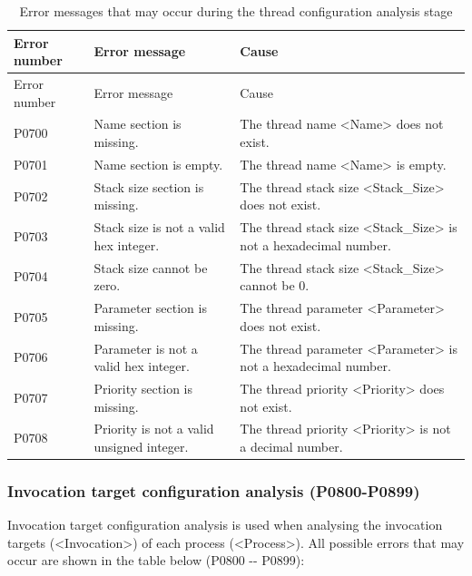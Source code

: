 \begin{xltabular}{\textwidth}{@{}>{\hsize\raggedright\arraybackslash}X>{\hsize\raggedright\arraybackslash}X>{\hsize\raggedright\arraybackslash}X@{}}
\caption{Error messages that may occur during the thread configuration analysis stage}\label{tab:5-10}\\
\toprule
Error number & Error message & Cause\tabularnewline
\endfirsthead
\toprule
Error number & Error message & Cause\tabularnewline
\midrule
\endhead
\bottomrule
\endlastfoot
P0700 & Name section is missing. &
The thread name <Name> does not exist.\tabularnewline
P0701 & Name section is empty. &
The thread name <Name> is empty.\tabularnewline
P0702 & Stack size section is missing. &
The thread stack size <Stack\_\allowbreak{}Size> does not exist.\tabularnewline
P0703 & Stack size is not a valid hex integer. &
The thread stack size <Stack\_\allowbreak{}Size> is not a hexadecimal number.\tabularnewline
P0704 & Stack size cannot be zero. &
The thread stack size <Stack\_\allowbreak{}Size> cannot be 0.\tabularnewline
P0705 & Parameter section is missing. &
The thread parameter <Parameter> does not exist.\tabularnewline
P0706 & Parameter is not a valid hex integer. &
The thread parameter <Parameter> is not a hexadecimal number.\tabularnewline
P0707 & Priority section is missing. &
The thread priority <Priority> does not exist.\tabularnewline
P0708 & Priority is not a valid unsigned integer. &
The thread priority <Priority> is not a decimal number.\tabularnewline
\end{xltabular}

\subsubsection{Invocation target configuration analysis (P0800-P0899)}\label{subsubsec:5-6-2-9}

Invocation target configuration analysis is used when analysing the invocation targets (<Invocation>) of each process (<Process>). All possible errors that may occur are shown in the table below (P0800
-\/- P0899):

